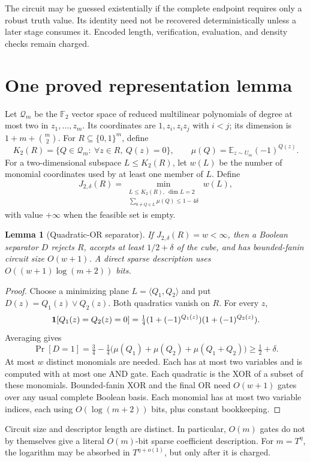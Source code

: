 \documentclass[11pt]{article}
\newtheorem{lemma}{Lemma}
\newcommand{\F}{\mathbb F}
\begin{document}
The circuit may be guessed existentially if the complete endpoint
requires only a robust truth value. Its identity need not be recovered
deterministically unless a later stage consumes it. Encoded length,
verification, evaluation, and density checks remain charged.

\section{One proved representation lemma}
Let $\mathcal Q_m$ be the $\F_2$ vector space of reduced multilinear
polynomials of degree at most two in $z_1,\ldots,z_m$. Its coordinates
are $1,z_i,z_iz_j$ with $i<j$; its dimension is
$1+m+\binom m2$. For $R\subseteq\{0,1\}^m$, define
\[
 K_2(R)=\{Q\in\mathcal Q_m:\ \forall z\in R,\ Q(z)=0\},
 \qquad
 \mu(Q)=\mathbb E_{z\sim U_m}(-1)^{Q(z)}.
\]
For a two-dimensional subspace $L\le K_2(R)$, let $w(L)$ be the number
of monomial coordinates used by at least one member of $L$.
Define
\[
 J_{2,\delta}(R)=
 \min_{\substack{L\le K_2(R),\ \dim L=2\\
                 \sum_{0\ne Q\in L}\mu(Q)\le1-4\delta}}w(L),
\]
with value $+\infty$ when the feasible set is empty.

\begin{lemma}[Quadratic-OR separator]
If $J_{2,\delta}(R)=w<\infty$, then a Boolean separator $D$ rejects $R$,
accepts at least $1/2+\delta$ of the cube, and has bounded-fanin circuit
size $O(w+1)$. A direct sparse description uses
$O((w+1)\log(m+2))$ bits.
\end{lemma}
\begin{proof}
Choose a minimizing plane $L=\langle Q_1,Q_2\rangle$ and put
$D(z)=Q_1(z)\lor Q_2(z)$. Both quadratics vanish on $R$.
For every $z$,
\[
 {\bf1}[Q_1(z)=Q_2(z)=0]
 =\tfrac14(1+(-1)^{Q_1(z)})(1+(-1)^{Q_2(z)}).
\]
Averaging gives
\[
 \Pr[D=1]
 =\tfrac34-\tfrac14\bigl(\mu(Q_1)+\mu(Q_2)+\mu(Q_1+Q_2)\bigr)
 \ge\tfrac12+\delta.
\]
At most $w$ distinct monomials are needed. Each has at most two
variables and is computed with at most one AND gate. Each quadratic
is the XOR of a subset of these monomials. Bounded-fanin XOR and the
final OR need $O(w+1)$ gates over any usual complete Boolean basis.
Each monomial has at most two variable indices, each using
$O(\log(m+2))$ bits, plus constant bookkeeping.
\end{proof}
Circuit size and descriptor length are distinct.
In particular, $O(m)$ gates do not by themselves give a literal $O(m)$-bit
sparse coefficient description. For $m=T^\eta$, the logarithm may be
absorbed in $T^{\eta+o(1)}$, but only after it is charged.
\end{document}

